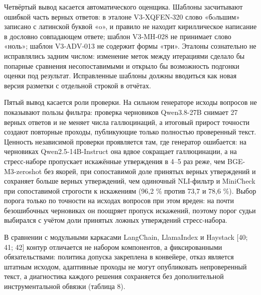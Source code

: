 \documentclass[14pt,a4paper]{extarticle}
\begin{document}
Четвёртый вывод касается автоматического оценщика. Шаблоны засчитывают ошибкой часть верных ответов: в эталоне V3‑XQFEN‑320 слово «бoльшим» записано с латинской буквой «o», и правило не находит кириллическое написание в дословно совпадающем ответе; шаблон V3‑MH‑028 не принимает слово «ноль»; шаблон V3‑ADV‑013 не содержит формы «три». Эталоны сознательно не исправлялись задним числом: изменение меток между итерациями сделало бы попарные сравнения несопоставимыми и открыло бы возможность подгонки оценки под результат. Исправленные шаблоны должны вводиться как новая версия разметки с отдельной строкой в отчётах.

Пятый вывод касается роли проверки. На сильном генераторе исходы вопросов не показывают пользы фильтра: проверка черновиков Qwen3.8-27B снимает 27 верных ответов и не меняет числа галлюцинаций, а итоговый прирост точности создают повторные проходы, публикующие только полностью проверенный текст. Ценность независимой проверки проявляется там, где генератор ошибается: на черновиках Qwen2.5-14B-Instruct она вдвое сокращает галлюцинации, а на стресс-наборе пропускает искажённые утверждения в 4–5 раз реже, чем BGE-M3-zeroshot без якорей, при сопоставимой доле принятых верных утверждений и сохраняет больше верных утверждений, чем одиночный NLI-фильтр и MiniCheck при сопоставимой строгости к искажениям (96,2 \% против 73,7 и 78,6 \%). Выбор порога только по точности на исходах вопросов при этом вреден: на почти безошибочных черновиках он поощряет пропуск искажений, поэтому порог судьи выбирался с учётом доли принятых ложных утверждений стресс-набора.

В сравнении с модульными каркасами LangChain, LlamaIndex и Haystack [40; 41; 42] контур отличается не набором компонентов, а фиксированными обязательствами: политика допуска закреплена в конвейере, отказ является штатным исходом, адаптивные проходы не могут опубликовать непроверенный текст, а диагностика каждого решения сохраняется без дополнительной инструментальной обвязки (таблица 8).
\end{document}
